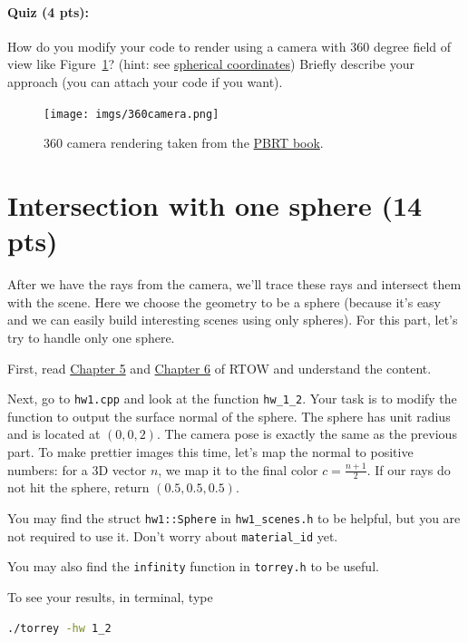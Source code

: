\paragraph{Quiz (4 pts):} How do you modify your code to render using a camera with 360 degree field of view like Figure~\ref{fig:360_camera}? (hint: see \href{https://en.wikipedia.org/wiki/Spherical_coordinate_system}{spherical coordinates}) Briefly describe your approach (you can attach your code if you want).
\begin{figure}[ht]
    \centering
    \texttt{[image: imgs/360camera.png]}
    \caption{360 camera rendering taken from the \href{https://www.pbr-book.org/3ed-2018/Camera_Models/Environment_Camera}{PBRT book}.}
    \label{fig:360_camera}
\end{figure}

\section{Intersection with one sphere (14 pts)}
After we have the rays from the camera, we'll trace these rays and intersect them with the scene. Here we choose the geometry to be a sphere (because it's easy and we can easily build interesting scenes using only spheres). For this part, let's try to handle only one sphere.

First, read \href{https://raytracing.github.io/books/RayTracingInOneWeekend.html\#addingasphere}{Chapter 5} and \href{https://raytracing.github.io/books/RayTracingInOneWeekend.html\#surfacenormalsandmultipleobjects}{Chapter 6} of RTOW and understand the content.

Next, go to \lstinline{hw1.cpp} and look at the function \lstinline{hw_1_2}. Your task is to modify the function to output the surface normal of the sphere. The sphere has unit radius and is located at $(0, 0, 2)$. The camera pose is exactly the same as the previous part. To make prettier images this time, let's map the normal to positive numbers: for a 3D vector $n$, we map it to the final color $c = \frac{n + 1}{2}$. If our rays do not hit the sphere, return $(0.5, 0.5, 0.5)$.

You may find the struct \lstinline{hw1::Sphere} in \lstinline{hw1_scenes.h} to be helpful, but you are not required to use it. Don't worry about \lstinline{material_id} yet.

You may also find the \lstinline{infinity} function in \lstinline{torrey.h} to be useful.

To see your results, in terminal, type
\begin{lstlisting}[language=bash]
  ./torrey -hw 1_2
\end{lstlisting}

